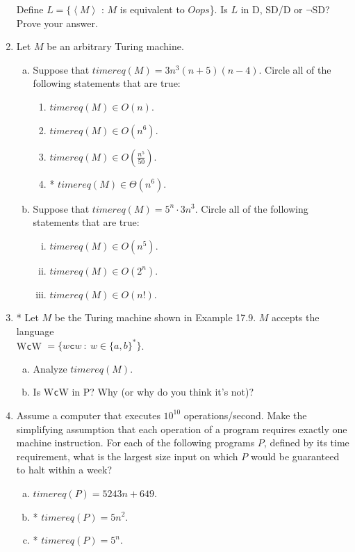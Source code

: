 \documentclass[10pt]{article}
\newcommand{\brackets}[1]{\left< #1 \right>}
\begin{document}
\begin{enumerate}[1)]
Define $L = \{\brackets{M}$ : $M$ is equivalent to $Oops$\}.  Is $L$ in D, SD/D or $\lnot$SD?  Prove your answer.


\item
Let $M$ be an arbitrary Turing machine.
\begin{enumerate}[a)]
\item
Suppose that $timereq(M) = 3n^3(n+5)(n-4)$.  Circle all of the following statements that are true:
\begin{enumerate}[i]
\item
$timereq(M) \in O(n)$.
\item
$timereq(M) \in O(n^6)$.
\item
$timereq(M) \in O(\frac{n^5}{50})$.
\item
* $timereq(M) \in \Theta(n^6)$.
\end{enumerate}

\item
Suppose that $timereq(M) = 5^n \cdot 3n^3$.  Circle all of the following statements that are true:
\begin{enumerate}[i)]
\item
$timereq(M) \in O(n^5)$.
\item
$timereq(M) \in O(2^n)$.
\item
$timereq(M) \in O(n!)$.
\end{enumerate}
\end{enumerate}


\item
* Let $M$ be the Turing machine shown in Example 17.9.  $M$ accepts the language\\ W\texttt{c}W $= \{w\texttt{c}w\ :\ w \in \{a, b\}^*\}$.
\begin{enumerate}[a)]
\item
Analyze $timereq(M)$.
\item
Is W\texttt{c}W in P?  Why (or why do you think it’s not)?
\end{enumerate}

\pagebreak

\item
Assume a computer that executes $10^{10}$ operations/second.  Make the simplifying assumption that each operation of a program requires exactly one machine instruction.  For each of the following programs $P$, defined by its time requirement, what is the largest size input on which $P$ would be guaranteed to halt within a week?
\begin{enumerate}[a)]
\item
$timereq(P) = 5243n+649$.
\item
* $timereq(P) = 5n^2$.
\item
* $timereq(P) = 5^n$.
\end{enumerate}



\end{enumerate}
\end{document}
